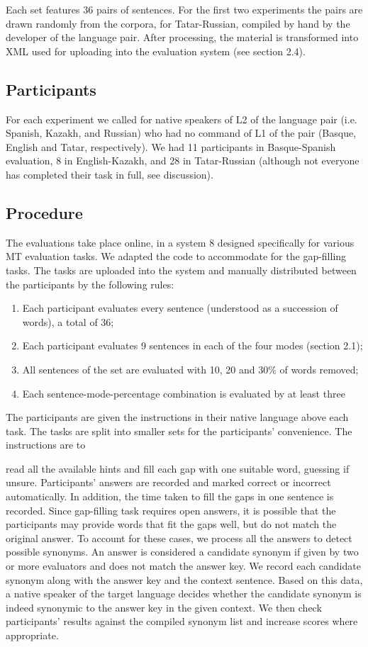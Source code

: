 \documentclass[11pt]{article}
\begin{document}
Each set features 36 pairs of sentences. For the first two experiments the pairs are drawn
randomly from the corpora, for Tatar-Russian, compiled by hand by the developer of the
language pair. After processing, the material is transformed into XML used for uploading
into the evaluation system (see section 2.4).

\subsection{Participants}

For each experiment we called for native speakers of L2 of the language pair (i.e.
Spanish, Kazakh, and Russian) who had no command of L1 of the pair (Basque, English
and Tatar, respectively). We had 11 participants in Basque-Spanish evaluation, 8 in
English-Kazakh, and 28 in Tatar-Russian (although not everyone has completed their task
in full, see discussion).

\subsection{Procedure}

The evaluations take place online, in a system 8 designed specifically for various MT
evaluation tasks. We adapted the code to accommodate for the gap-filling tasks. The
tasks are uploaded into the system and manually distributed between the participants by
the following rules:
\begin{enumerate}
\item  Each participant evaluates every sentence (understood as a succession of words),
a total of 36;
\item  Each participant evaluates 9 sentences in each of the four modes (section 2.1);
\item  All sentences of the set are evaluated with 10, 20 and 30\% of words removed;
\item  Each sentence-mode-percentage combination is evaluated by at least three
\end{enumerate}
The participants are given the instructions in their native language above each task. The
tasks are split into smaller sets for the participants’ convenience. The instructions are to

read all the available hints and fill each gap with one suitable word, guessing if unsure.
Participants’ answers are recorded and marked correct or incorrect automatically. In
addition, the time taken to fill the gaps in one sentence is recorded.
Since gap-filling task requires open answers, it is possible that the participants may
provide words that fit the gaps well, but do not match the original answer. To account for
these cases, we process all the answers to detect possible synonyms. An answer is
considered a candidate synonym if given by two or more evaluators and does not match
the answer key. We record each candidate synonym along with the answer key and the
context sentence. Based on this data, a native speaker of the target language decides
whether the candidate synonym is indeed synonymic to the answer key in the given
context. We then check participants’ results against the compiled synonym list and
increase scores where appropriate.
\end{document}
